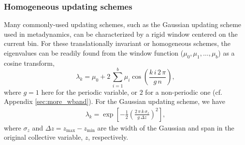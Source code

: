 \documentclass[reprint, superscriptaddress, floatfix]{revtex4-1}
\newcommand{\Err}{E}
\begin{document}
%




\subsubsection{\label{sec:band-matrix}
Homogeneous updating schemes}



Many commonly-used updating schemes,
such as the Gaussian updating scheme
used in metadynamics,
can be characterized by a rigid window
centered on the current bin.
%
For these translationally invariant or homogeneous
schemes, the eigenvalues can be readily found
from the window function ($\mu_0, \mu_1, \dots, \mu_b$)
as a cosine transform,
%
\begin{equation}
  \lambda_k
  =
  \mu_0
  +
  2 \,
  \sum_{ i = 1 }^b
  \mu_i
  \cos\left(
  \frac{ k \, i \, 2 \, \pi }
       {      g \, n        }
  \right)
  ,
  \label{eq:wband_eigenvalue}
\end{equation}
%
where $g = 1$ here for the periodic variable,
or $2$ for a non-periodic one
(cf. Appendix \ref{sec:more_wband}).
%
For the Gaussian updating scheme,
we have\cite{bussi2006}
\begin{align}
  \lambda_k
  =
  \exp\left[
        -\frac 1 2
        \left(
         \frac{ 2 \, \pi \, k \, \sigma_z }
              { g \, \Delta z  }
        \right)^2
      \right]
  ,
\label{eq:lambda_Gaussian}
\end{align}
where $\sigma_z$ and $\Delta z = z_{\max} - z_{\min}$
are the width of the Gaussian and span
in the original collective variable, $z$,
respectively.
\end{document}
